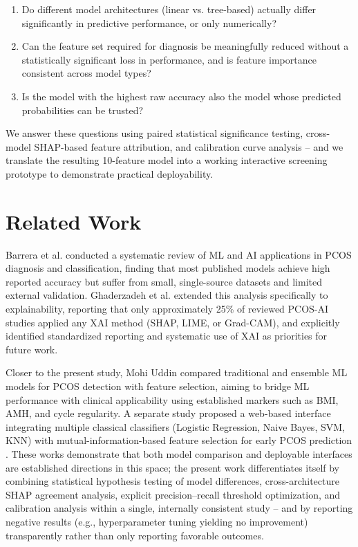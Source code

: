 \documentclass[conference]{IEEEtran}
\begin{document}
\begin{enumerate}
    \item Do different model architectures (linear vs. tree-based) actually differ significantly in predictive performance, or only numerically?
    \item Can the feature set required for diagnosis be meaningfully reduced without a statistically significant loss in performance, and is feature importance consistent across model types?
    \item Is the model with the highest raw accuracy also the model whose predicted probabilities can be trusted?
\end{enumerate}

We answer these questions using paired statistical significance testing, cross-model SHAP-based feature attribution, and calibration curve analysis -- and we translate the resulting 10-feature model into a working interactive screening prototype to demonstrate practical deployability.

\section{Related Work}

Barrera et al. \cite{barrera2023} conducted a systematic review of ML and AI applications in PCOS diagnosis and classification, finding that most published models achieve high reported accuracy but suffer from small, single-source datasets and limited external validation. Ghaderzadeh et al. \cite{ghaderzadeh2025} extended this analysis specifically to explainability, reporting that only approximately 25\% of reviewed PCOS-AI studies applied any XAI method (SHAP, LIME, or Grad-CAM), and explicitly identified standardized reporting and systematic use of XAI as priorities for future work.

Closer to the present study, Mohi Uddin \cite{mohiuddin2025} compared traditional and ensemble ML models for PCOS detection with feature selection, aiming to bridge ML performance with clinical applicability using established markers such as BMI, AMH, and cycle regularity. A separate study proposed a web-based interface integrating multiple classical classifiers (Logistic Regression, Naive Bayes, SVM, KNN) with mutual-information-based feature selection for early PCOS prediction \cite{webbased2024}. These works demonstrate that both model comparison and deployable interfaces are established directions in this space; the present work differentiates itself by combining statistical hypothesis testing of model differences, cross-architecture SHAP agreement analysis, explicit precision--recall threshold optimization, and calibration analysis within a single, internally consistent study -- and by reporting negative results (e.g., hyperparameter tuning yielding no improvement) transparently rather than only reporting favorable outcomes.
\end{document}
